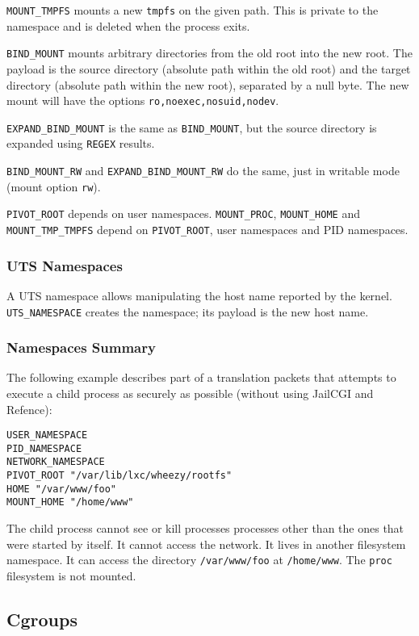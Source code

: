 \documentclass[a4paper,12pt]{article}
\begin{document}
\verb|MOUNT_TMPFS| mounts a new \texttt{tmpfs} on the given path.
This is private to the namespace and is deleted when the process
exits.

\verb|BIND_MOUNT| mounts arbitrary directories from the old root into
the new root.  The payload is the source directory (absolute path
within the old root) and the target directory (absolute path within
the new root), separated by a null byte.  The new mount will have the
options \texttt{ro,noexec,nosuid,nodev}.

\verb|EXPAND_BIND_MOUNT| is the same as \verb|BIND_MOUNT|, but the
source directory is expanded using \verb|REGEX| results.

\verb|BIND_MOUNT_RW| and \verb|EXPAND_BIND_MOUNT_RW| do the same, just
in writable mode (mount option \verb|rw|).

\verb|PIVOT_ROOT| depends on user namespaces.  \verb|MOUNT_PROC|,
\verb|MOUNT_HOME| and \verb|MOUNT_TMP_TMPFS| depend on
\verb|PIVOT_ROOT|, user namespaces and PID namespaces.

\subsubsection{UTS Namespaces}

A UTS namespace allows manipulating the host name reported by the
kernel.  \verb|UTS_NAMESPACE| creates the namespace; its payload is
the new host name.

\subsubsection{Namespaces Summary}

The following example describes part of a translation packets that
attempts to execute a child process as securely as possible (without
using JailCGI and Refence):

\begin{verbatim}
USER_NAMESPACE
PID_NAMESPACE
NETWORK_NAMESPACE
PIVOT_ROOT "/var/lib/lxc/wheezy/rootfs"
HOME "/var/www/foo"
MOUNT_HOME "/home/www"
\end{verbatim}

The child process cannot see or kill processes processes other than
the ones that were started by itself.  It cannot access the network.
It lives in another filesystem namespace.  It can access the directory
\texttt{/var/www/foo} at \texttt{/home/www}.  The \texttt{proc}
filesystem is not mounted.

\subsection{Cgroups}
\label{cgroups}
\end{document}

